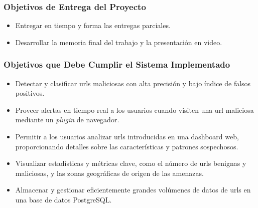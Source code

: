 \subsubsection{Objetivos de Entrega del Proyecto}
\begin{itemize}
  \item Entregar en tiempo y forma las entregas parciales.
  \item Desarrollar la memoria final del trabajo y la presentación en video.
\end{itemize}

\subsubsection{Objetivos que Debe Cumplir el Sistema Implementado}
\begin{itemize}
    \item Detectar y clasificar \glspl{url} maliciosas con alta precisión y bajo índice de falsos positivos.
    \item Proveer alertas en tiempo real a los usuarios cuando visiten una \gls{url} maliciosa mediante un \textit{\gls{plugin}} de navegador.
    \item Permitir a los usuarios analizar \glspl{url} introducidas en una \gls{dashboard} web, proporcionando detalles sobre las características y patrones sospechosos.
    \item Visualizar estadísticas y métricas clave, como el número de \glspl{url} benignas y maliciosas, y las zonas geográficas de origen de las amenazas.
    \item Almacenar y gestionar eficientemente grandes volúmenes de datos de \glspl{url} en una base de datos PostgreSQL.
\end{itemize}

